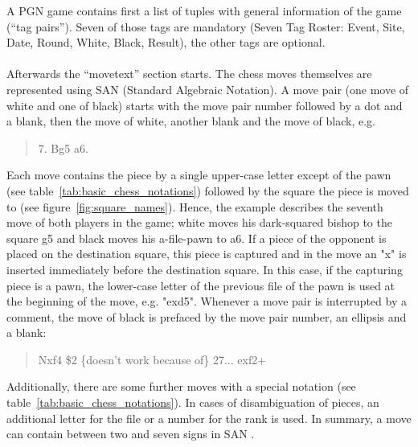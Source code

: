 \documentclass[article,type=msc,colorback,accentcolor=tud7b]{tudthesis}
\begin{document}
    A PGN game contains first a list of tuples with general information of the game (“tag pairs”). Seven of those tags are mandatory (Seven Tag Roster: Event, Site, Date, Round, White, Black, Result), the other tags are optional. \\\\
    Afterwards the “movetext” section starts. The chess moves themselves are represented using SAN (Standard Algebraic Notation). A move pair (one move of white and one of black) starts with the move pair number followed by a dot and a blank, then the move of white, another blank and the move of black, e.g. 
    \begin{quotation}
      7. Bg5 a6.
    \end{quotation}    
    Each move contains the piece by a single upper-case letter except of the pawn (see table~\ref{tab:basic_chess_notations}) followed by the square the piece is moved to (see figure~\ref{fig:square_names}). Hence, the example describes the seventh move of both players in the game; white moves his dark-squared bishop to the square g5 and black moves his a-file-pawn to a6. If a piece of the opponent is placed on the destination square, this piece is captured and in the move an "x" is inserted immediately before the destination square. In this case, if the capturing piece is a pawn, the lower-case letter of the previous file of the pawn is used at the beginning of the move, e.g. "exd5". Whenever a move pair is interrupted by a comment, the move of black is prefaced by the move pair number, an ellipsis and a blank: 
    \begin{quotation}
      Nxf4 \$2 \{doesn't work because of\} 27... exf2+
    \end{quotation}
    Additionally, there are some further moves with a special notation (see table~\ref{tab:basic_chess_notations}). In cases of disambiguation of pieces, an additional letter for the file or a number for the rank is used. In summary, a move can contain between two and seven signs in SAN \autocite[Chapter~8]{Edwards1994}.
	
\end{document}
